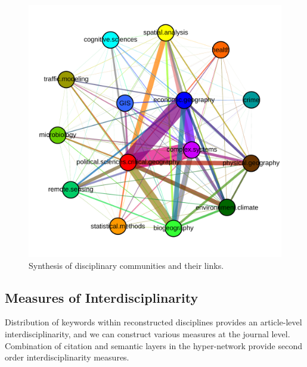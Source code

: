 \begin{figure}
\centering
\includegraphics[width=\textwidth]{figures/synththemcyb}
\caption{Synthesis of disciplinary communities and their links.}
\label{fig:comsynthesis}
\end{figure}




\subsection*{Measures of Interdisciplinarity}





Distribution of keywords within reconstructed disciplines provides an article-level interdisciplinarity, and we can construct various measures at the journal level. Combination of citation and semantic layers in the hyper-network provide second order interdisciplinarity measures.



